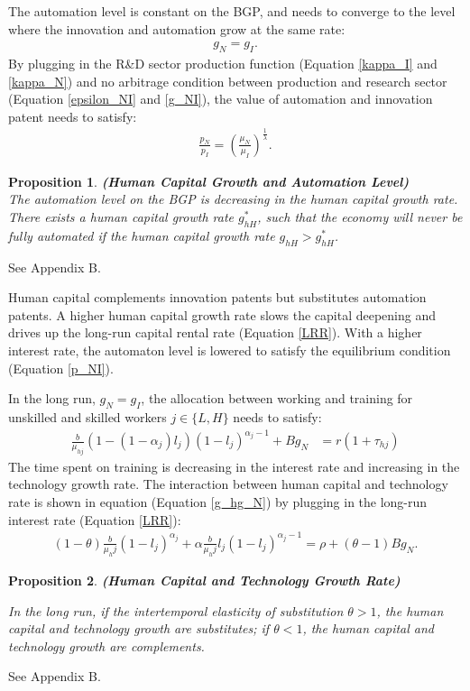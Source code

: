 \documentclass[12pt]{article}
\newtheorem{proposition}{Proposition}
\begin{document}
The automation level is constant on the BGP, and needs to converge to the level where the innovation and automation grow at the same rate: 
\begin{align}
\label{g_NI}
g_N = g_I. 
\end{align}
By plugging in the R\&D sector production function (Equation \ref{kappa_I} and \ref{kappa_N}) and no arbitrage condition between production and research sector (Equation \ref{epsilon_NI} and \ref{g_NI}), the value of automation and innovation patent needs to satisfy:
\begin{align}
\label{p_NI}
\frac{p_N}{p_I} = (\frac{\mu_N}{\mu_I})^{\frac{1}{\lambda}}.
\end{align}
\begin{proposition}{\bf (Human Capital Growth and Automation Level)} \\

The automation level on the BGP is decreasing in the human capital growth rate. There exists a human capital growth rate $g_{hH}^*$, such that the economy will never be fully automated if the human capital growth rate $g_{hH}>g_{hH}^*$. 
\end{proposition}
 See Appendix B.

Human capital complements innovation patents but substitutes automation patents. A higher human capital growth rate slows the capital deepening and drives up the long-run capital rental rate (Equation \ref{LRR}). With a higher interest rate, the automaton level is lowered to satisfy the equilibrium condition (Equation \ref{p_NI}).

In the long run, $g_N = g_I$, the allocation between working and training for unskilled and skilled workers $j\in\{L,H\}$ needs to satisfy:
\begin{align*}
\frac{b}{\mu_{hj}}(1-(1-\alpha_j)l_j)(1-l_j)^{\alpha_j-1}+Bg_N&= r(1+\tau_{hj}) 
\end{align*}
The time spent on training is decreasing in the interest rate and increasing in the technology growth rate. The interaction between human capital and technology rate is shown in equation (Equation \ref{g_hg_N}) by plugging in the long-run interest rate (Equation \ref{LRR}):
\begin{align} 
\label{g_hg_N}
(1-\theta)\frac{b}{\mu_hj}(1-l_j)^{\alpha_j}+\alpha\frac{b}{\mu_hj}l_j(1-l_j)^{\alpha_j-1} = \rho+(\theta-1)Bg_N.
\end{align}

\begin{proposition}{\bf (Human Capital and Technology Growth Rate)}

In the long run, if the intertemporal elasticity of substitution $\theta>1$, the human capital and technology growth are substitutes; if $\theta<1$, the human capital and technology growth are complements.
\end{proposition}
 See Appendix B.
\end{document}
